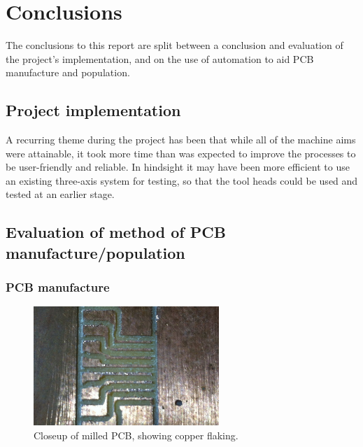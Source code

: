 %
%
	 


\section{Conclusions}
The conclusions to this report are split between a conclusion
and evaluation of the project's implementation, and on the use of automation
to aid PCB manufacture and population.

\subsection{Project implementation}
A recurring theme during the project has been that while all of the machine
aims were attainable, it took more time than was expected to improve
the processes to be user-friendly and reliable. In hindsight it may
have been more efficient to use an existing three-axis system for testing,
so that the tool heads could be used and tested at an earlier stage.

\subsection{Evaluation of method of PCB manufacture/population}

\subsubsection{PCB manufacture}


\begin{figure}[ht!]
\centering
\includegraphics[width=70mm]{resources/flake.jpg}
\caption{Closeup of milled PCB, showing copper flaking.}
\label{flake}
\end{figure}


